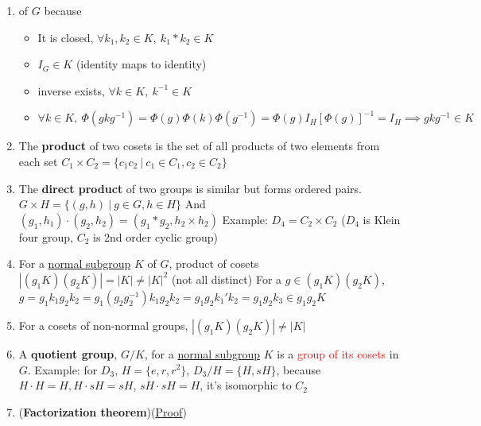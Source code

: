 \documentclass{article}
\theoremstyle{remark}
\theoremstyle{remark}
\begin{document}
\begin{enumerate}
\begin{itemize}
        \end{itemize}
        \item {} of $G$ because\begin{itemize}
                \item It is closed, $\forall k_1,k_2\in K,\ k_1*k_2\in K$
                \item $I_G\in K$ (identity maps to identity)
                \item inverse exists, $\forall k\in K,\ k^{-1}\in K$
                \item $\forall k\in K,\ \Phi(gkg^{-1})=\Phi(g)\Phi(k)\Phi(g^{-1})=\Phi(g)I_H[\Phi(g)]^{-1}=I_H\implies gkg^{-1}\in K$
            \end{itemize}
        \item The \textbf{product} of two cosets is the set of all products of two elements from each set $C_1\times C_2=\{c_1c_2\ |\ c_1\in C_1,c_2\in C_2\}$
        \item The \textbf{direct product} of two groups is similar but forms ordered pairs. $G\times H=\{(g,h)\ |\ g\in G,h\in H\}$\newline
                And $(g_1,h_1)\cdot(g_2,h_2)=(g_1*g_2,h_2\times h_2)$\newline
                Example: $D_4 = C_2\times C_2$ ($D_4$ is Klein four group, $C_2$ is 2nd order cyclic group)
        \item For a \underline{normal subgroup} $K$ of $G$, product of cosets $|(g_1K)(g_2K)|=|K|\neq|K|^2$ (not all distinct)\newline
                For a $g\in(g_1K)(g_2K)$, $g=g_1k_1g_2k_2=g_1(g_2g_2^{-1})k_1g_2k_2=g_1g_2k_1'k_2 = g_1g_2k_3\in g_1g_2K$
        \item For a cosets of non-normal groups, $|(g_1K)(g_2K)|\neq|K|$
        \item A \textbf{quotient group}, $G/K$, for a \underline{normal subgroup} $K$ is a \textcolor{red}{group of its cosets} in $G$.\newline
                Example: for $D_3$, $H=\{e,r,r^2\}$, $D_3/H=\{H, sH\}$, because $H\cdot H=H, H\cdot sH=sH$, $sH\cdot sH=H$, it's isomorphic to $C_2$
        \item (\textbf{Factorization theorem})(\href{https://math.libretexts.org/Bookshelves/Abstract_and_Geometric_Algebra/First-Semester_Abstract_Algebra%3A_A_Structural_Approach_(Sklar)/09%3A_The_Isomorphism_Theorem/9.01%3A_The_First_Isomorphism_Theorem}{Proof})\newline

\end{enumerate}
\end{document}
